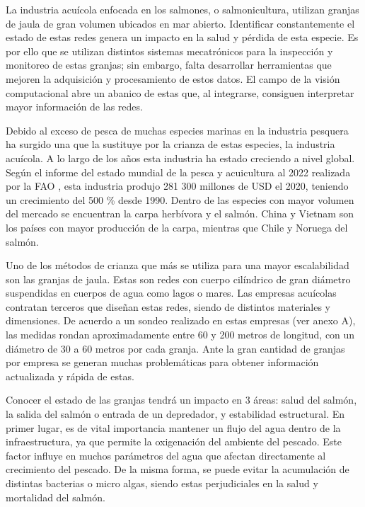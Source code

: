 

La industria acuícola enfocada en los salmones, o salmonicultura, utilizan granjas de jaula de gran volumen ubicados en mar abierto. Identificar constantemente el estado de estas redes genera un impacto en la salud y pérdida de esta especie. Es por ello que se utilizan distintos sistemas mecatrónicos para la inspección y monitoreo de estas granjas; sin embargo, falta desarrollar herramientas que mejoren la adquisición y procesamiento de estos datos. El campo de la visión computacional abre un abanico de estas que, al integrarse, consiguen interpretar mayor información de las redes. 
 


Debido al exceso de pesca de muchas especies marinas en la industria pesquera ha surgido una que la sustituye por la crianza de estas especies, la industria acuícola. A lo largo de los años esta industria ha estado creciendo a nivel global. Según el informe del estado mundial de la pesca y acuicultura al 2022 realizada por la FAO \cite{FAO}, esta industria produjo 281 300 millones de USD el 2020, teniendo un crecimiento del 500 \% desde 1990. Dentro de las especies con mayor volumen del mercado se encuentran la carpa herbívora y el salmón. China y Vietnam son los países con mayor producción de la carpa, mientras que Chile y Noruega del salmón. 

Uno de los métodos de crianza que más se utiliza para una mayor escalabilidad son las granjas de jaula. Estas son redes con cuerpo cilíndrico de gran diámetro suspendidas en cuerpos de agua como lagos o mares. Las empresas acuícolas contratan terceros que diseñan estas redes, siendo de distintos materiales y dimensiones. De acuerdo a un sondeo realizado en estas empresas (ver anexo A), las medidas rondan aproximadamente entre 60 y 200 metros de longitud, con un diámetro de 30 a 60 metros por cada granja. Ante la gran cantidad de granjas por empresa se generan muchas problemáticas para obtener información actualizada y rápida de estas.

Conocer el estado de las granjas tendrá un impacto en 3 áreas: salud del salmón, la salida del salmón o entrada de un depredador, y estabilidad estructural. En primer lugar, es de vital importancia mantener un flujo del agua dentro de la infraestructura, ya que permite la oxigenación del ambiente del pescado. Este factor influye en muchos parámetros del agua que afectan directamente al crecimiento del pescado. De la misma forma, se puede evitar la acumulación de distintas bacterias o micro algas, siendo estas perjudiciales en la salud y mortalidad del salmón. 

